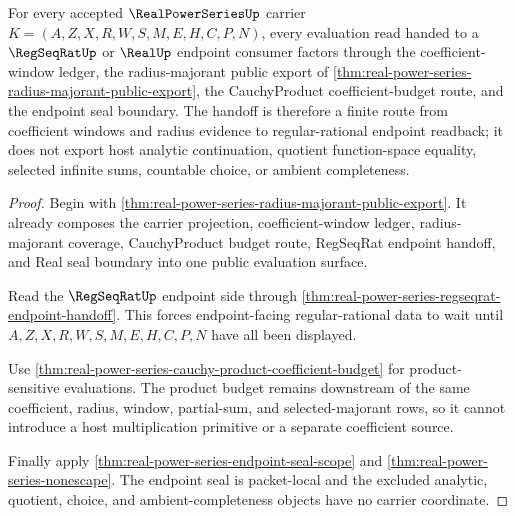 \begin{theorem}
\label{thm:real-power-series-regseqrat-evaluation-handoff}
For every accepted $\RealPowerSeriesUp$ carrier $K=(A,Z,X,R,W,S,M,E,H,C,P,N)$, every evaluation read handed to a $\RegSeqRatUp$ or $\RealUp$ endpoint consumer factors through the coefficient-window ledger, the radius-majorant public export of \autoref{thm:real-power-series-radius-majorant-public-export}, the CauchyProduct coefficient-budget route, and the endpoint seal boundary. The handoff is therefore a finite route from coefficient windows and radius evidence to regular-rational endpoint readback; it does not export host analytic continuation, quotient function-space equality, selected infinite sums, countable choice, or ambient completeness.
\end{theorem}
\begin{proof}
Begin with \autoref{thm:real-power-series-radius-majorant-public-export}. It already composes the carrier projection, coefficient-window ledger, radius-majorant coverage, CauchyProduct budget route, RegSeqRat endpoint handoff, and Real seal boundary into one public evaluation surface.

Read the $\RegSeqRatUp$ endpoint side through \autoref{thm:real-power-series-regseqrat-endpoint-handoff}. This forces endpoint-facing regular-rational data to wait until $A,Z,X,R,W,S,M,E,H,C,P,N$ have all been displayed.

Use \autoref{thm:real-power-series-cauchy-product-coefficient-budget} for product-sensitive evaluations. The product budget remains downstream of the same coefficient, radius, window, partial-sum, and selected-majorant rows, so it cannot introduce a host multiplication primitive or a separate coefficient source.

Finally apply \autoref{thm:real-power-series-endpoint-seal-scope} and \autoref{thm:real-power-series-nonescape}. The endpoint seal is packet-local and the excluded analytic, quotient, choice, and ambient-completeness objects have no carrier coordinate.
\end{proof}

